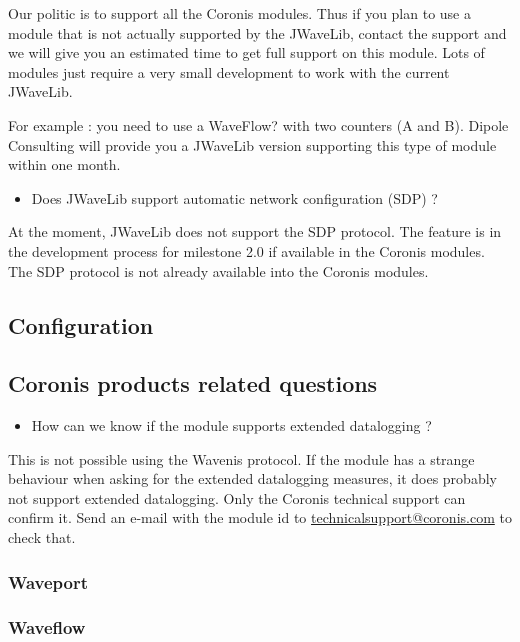 \documentclass[a4paper,10pt,english]{sphinxmanual}
\begin{document}
Our politic is to support all the Coronis modules. Thus if you plan to use a module that is not actually supported by the JWaveLib, contact the support and we will give you an estimated time to get full support on this module. Lots of modules just require a very small development to work with the current JWaveLib.

For example : you need to use a WaveFlow? with two counters (A and B). Dipole Consulting will provide you a JWaveLib version supporting this type of module within one month.
\begin{itemize}
\item {} 
Does JWaveLib support automatic network configuration (SDP) ?

\end{itemize}

At the moment, JWaveLib does not support the SDP protocol. The feature is in the development process for milestone 2.0 if available in the Coronis modules. The SDP protocol is not already available into the Coronis modules.


\subsection{Configuration}
\label{support:configuration}

\subsection{Coronis products related questions}
\label{support:coronis-products-related-questions}\begin{itemize}
\item {} 
How can we know if the module supports extended datalogging ?

\end{itemize}

This is not possible using the Wavenis protocol. If the module has a strange behaviour when asking for the extended datalogging measures, it does probably not support extended datalogging. Only the Coronis technical support can confirm it. Send an e-mail with the module id to \href{mailto:technicalsupport@coronis.com}{technicalsupport@coronis.com} to check that.


\subsubsection{Waveport}
\label{support:waveport}

\subsubsection{Waveflow}
\label{support:waveflow}
\end{document}
